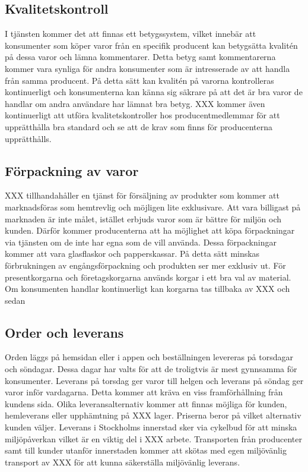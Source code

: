 \documentclass[10pt,a4paper,oneside]{article}
\begin{document}
\subsection{Kvalitetskontroll}
I tjänsten kommer det att finnas ett betygssystem, vilket innebär att konsumenter som köper varor från en specifik producent kan betygsätta kvalitén på dessa varor och lämna kommentarer. Detta betyg samt kommentarerna kommer vara synliga för andra konsumenter som är intresserade av att handla från samma producent. På detta sätt kan kvalitén på varorna kontrolleras kontinuerligt och konsumenterna kan känna sig säkrare på att det är bra varor de handlar om andra användare har lämnat bra betyg. XXX kommer även kontinuerligt att utföra kvalitetskontroller hos producentmedlemmar för att upprätthålla bra standard och se att de krav som finns för producenterna upprätthålls. 

\subsection{Förpackning av varor}
XXX tillhandahåller en tjänst för försäljning av produkter som kommer att marknadsföras som hemtrevlig och möjligen lite exklusivare. Att vara billigast på marknaden är inte målet, istället erbjuds varor som är bättre för miljön och kunden. Därför kommer producenterna att ha möjlighet att köpa förpackningar via tjänsten om de inte har egna som de vill använda. Dessa förpackningar kommer att vara glasflaskor och papperskassar. På detta sätt minskas förbrukningen av engångsförpackning och produkten ser mer exklusiv ut. För presentkorgarna och företagskorgarna används korgar i ett bra val av material. Om konsumenten handlar kontinuerligt kan korgarna tas tillbaka av XXX och sedan 
\subsection{Order och leverans}
Orden läggs på hemsidan eller i appen och beställningen levereras på torsdagar och söndagar. Dessa dagar har valts för att de troligtvis är mest gynnsamma för konsumenter. Leverans på torsdag ger varor till helgen och leverans på söndag ger varor inför vardagarna. Detta kommer att kräva en viss framförhållning från kundens sida. Olika leveransalternativ kommer att finnas möjliga för kunden, hemleverans eller upphämtning på XXX lager. Priserna beror på vilket alternativ kunden väljer. Leverans i Stockholms innerstad sker via cykelbud för att minska miljöpåverkan vilket är en viktig del i XXX arbete. Transporten från producenter samt till kunder utanför innerstaden kommer att skötas med egen miljövänlig transport av XXX för att kunna säkerställa miljövänlig leverans. 
\end{document}
